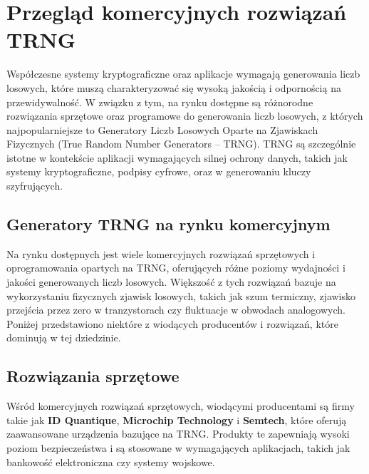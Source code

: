 \chapter{Przegląd komercyjnych rozwiązań TRNG}

Współczesne systemy kryptograficzne oraz aplikacje wymagają generowania liczb losowych, które muszą charakteryzować się wysoką jakością i odpornością na przewidywalność. W związku z tym, na rynku dostępne są różnorodne rozwiązania sprzętowe oraz programowe do generowania liczb losowych, z których najpopularniejsze to Generatory Liczb Losowych Oparte na Zjawiskach Fizycznych (True Random Number Generators – TRNG). TRNG są szczególnie istotne w kontekście aplikacji wymagających silnej ochrony danych, takich jak systemy kryptograficzne, podpisy cyfrowe, oraz w generowaniu kluczy szyfrujących.

\section{Generatory TRNG na rynku komercyjnym}

Na rynku dostępnych jest wiele komercyjnych rozwiązań sprzętowych i oprogramowania opartych na TRNG, oferujących różne poziomy wydajności i jakości generowanych liczb losowych. Większość z tych rozwiązań bazuje na wykorzystaniu fizycznych zjawisk losowych, takich jak szum termiczny, zjawisko przejścia przez zero w tranzystorach czy fluktuacje w obwodach analogowych. Poniżej przedstawiono niektóre z wiodących producentów i rozwiązań, które dominują w tej dziedzinie.

\section{Rozwiązania sprzętowe}

Wśród komercyjnych rozwiązań sprzętowych, wiodącymi producentami są firmy takie jak \textbf{ID Quantique}, \textbf{Microchip Technology} i \textbf{Semtech}, które oferują zaawansowane urządzenia bazujące na TRNG. Produkty te zapewniają wysoki poziom bezpieczeństwa i są stosowane w wymagających aplikacjach, takich jak bankowość elektroniczna czy systemy wojskowe.


